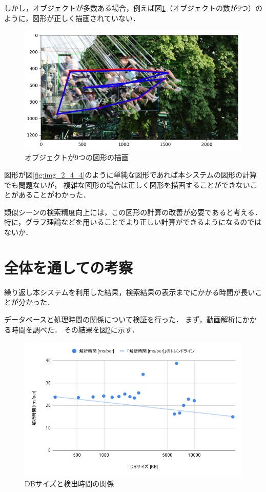 \documentclass[a4j,12pt,dvipdfmx]{jreport}
\begin{document}
しかし，オブジェクトが多数ある場合，例えば図\ref{fig:img_2_4_5}（オブジェクトの数が9つ）のように，図形が正しく描画されていない．
\begin{figure}[t]
  \centering
  \includegraphics[width=13cm]{image/result_2_4_5.png}
  \caption{オブジェクトが9つの図形の描画}
  \label{fig:img_2_4_5}
\end{figure}

図形が図\ref{fig:img_2_4_4}のように単純な図形であれば本システムの図形の計算でも問題ないが，
複雑な図形の場合は正しく図形を描画することができないことがあることがわかった．

類似シーンの検索精度向上には，この図形の計算の改善が必要であると考える．
特に，グラフ理論などを用いることでより正しい計算ができるようになるのではないか．

\section{全体を通しての考察}\label{chap4-4}

繰り返し本システムを利用した結果，検索結果の表示までにかかる時間が長いことが分かった．

データベースと処理時間の関係について検証を行った．
まず，動画解析にかかる時間を調べた．
その結果を図\ref{fig:img_2_5}に示す．
\begin{figure}[H]
  \centering
  \includegraphics[width=13cm]{image/result_2_5.png}
  \caption{DBサイズと検出時間の関係}
  \label{fig:img_2_5}
\end{figure}
\end{document}
